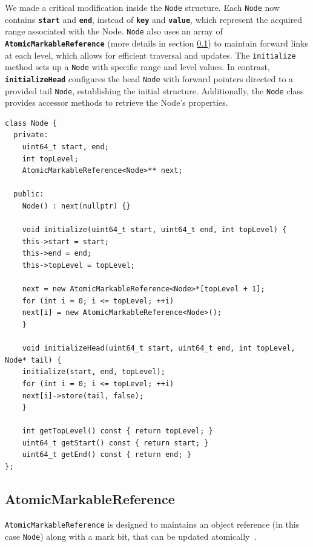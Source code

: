 We made a critical modification inside the \texttt{Node} structure.
Each \texttt{Node} now contains \textbf{\texttt{start}} and \textbf{\texttt{end}}, instead of \textbf{\texttt{key}} and \textbf{\texttt{value}}, which represent the acquired range associated with the Node.
\texttt{Node} also uses an array of \textbf{\texttt{AtomicMarkableReference}} (more details in section \ref{subsec:atomicmarkablereference}) to maintain forward links at each level, which allows for efficient traversal and updates.
The \texttt{initialize} method sets up a \texttt{Node} with specific range and level values.
In contrast, \textbf{\texttt{initializeHead}} configures the head \texttt{Node} with forward pointers directed to a provided tail \texttt{Node}, establishing the initial structure.
Additionally, the \texttt{Node} class provides accessor methods to retrieve the Node's properties.

\vspace{15pt}

\begin{lstlisting}[style=mystyle, caption=Node class implementation,label={}]
class Node {
  private:
    uint64_t start, end;
    int topLevel;
    AtomicMarkableReference<Node>** next;

  public:
    Node() : next(nullptr) {}

    void initialize(uint64_t start, uint64_t end, int topLevel) {
    this->start = start;
    this->end = end;
    this->topLevel = topLevel;

    next = new AtomicMarkableReference<Node>*[topLevel + 1];
    for (int i = 0; i <= topLevel; ++i)
    next[i] = new AtomicMarkableReference<Node>();
    }

    void initializeHead(uint64_t start, uint64_t end, int topLevel, Node* tail) {
    initialize(start, end, topLevel);
    for (int i = 0; i <= topLevel; ++i)
    next[i]->store(tail, false);
    }

    int getTopLevel() const { return topLevel; }
    uint64_t getStart() const { return start; }
    uint64_t getEnd() const { return end; }
};
\end{lstlisting}

\subsection{AtomicMarkableReference} \label{subsec:atomicmarkablereference}

\texttt{AtomicMarkableReference} is designed to maintains an object reference (in this case \texttt{Node}) along with a mark bit, that can be updated atomically~\parencite{atomicMarkableReference}.

